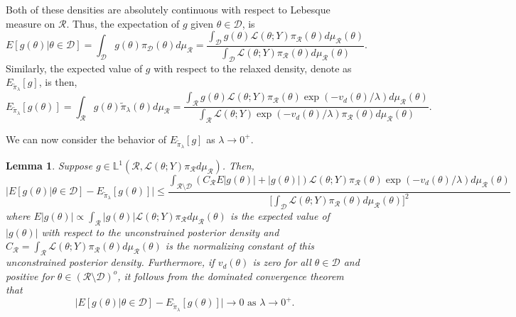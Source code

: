 \documentclass[10pt,fleqn]{article}
\newtheorem{lemma}{Lemma}
\DeclareMathOperator{\1}{\mathbbm{1}}
\begin{document}
{Both of these densities are absolutely continuous with respect to Lebesque measure on $\mathcal{R}$.  Thus, the expectation of $g$ given $\theta\in\mathcal{D}$, is
\begin{equation}
\label{EQ:Expectation_Positive_Measure_Constraint}
E[g(\theta)|\theta\in\mathcal{D}] = \int_\mathcal{D} g(\theta)\pi_\mathcal{D}(\theta)d\mu_\mathcal{R} = \frac{\int_\mathcal{D} g(\theta)\mathcal{L}(\theta; Y) \pi_\mathcal{R}(\theta)d\mu_\mathcal{R}(\theta)}{\int_\mathcal{D} \mathcal{L}(\theta; Y) \pi_\mathcal{R}(\theta)d\mu_\mathcal{R}(\theta)}.
\end{equation} 
Similarly, the expected value of $g$ with respect to the relaxed density, denote as $E_{\tilde{\pi}_\lambda}[g]$, is then,
\begin{equation}
\label{EQ:Expectation_Positive_Measure_Relaxed}
E_{\tilde{\pi}_\lambda}[g(\theta)] = \int_\mathcal{R} g(\theta)\tilde{\pi}_\lambda(\theta)d\mu_\mathcal{R} = \frac{\int_\mathcal{R} g(\theta)\mathcal{L}(\theta; Y) \pi_\mathcal{R}(\theta) \exp(-v_d(\theta)/\lambda)d\mu_\mathcal{R}(\theta)}{\int_\mathcal{R} \mathcal{L}(\theta; Y)\exp(-v_d(\theta)/\lambda) \pi_\mathcal{R}(\theta)d\mu_\mathcal{R}(\theta)}.\end{equation}

We can now consider the behavior of $E_{\tilde{\pi}_\lambda}[g]$ as $\lambda \to 0^+.$

\begin{lemma}
\label{THM:positive_measure_approximation_error}
Suppose $g \in \mathbb{L}^1(\mathcal{R}, \mathcal{L}(\theta;Y)\pi_\mathcal{R}d\mu_\mathcal{R})$.  Then,
$$\bigg|E[g(\theta) |\theta\in\mathcal{D}] - E_{\tilde{\pi}_\lambda}[g(\theta)]   \bigg| \le \frac{\int_{\mathcal{R}\setminus \mathcal{D}} (C_\mathcal{R}E|g(\theta)|+|g(\theta)|) \mathcal{L}(\theta; Y) \pi_\mathcal{R}(\theta)\exp(-v_d(\theta)/\lambda ) d\mu_\mathcal{R}(\theta)}{\big[\int_\mathcal{D} \mathcal{L}(\theta; Y) \pi_\mathcal{R}(\theta)d\mu_\mathcal{R}(\theta)\big]^2 }$$
where $E|g(\theta)| \propto \int_\mathcal{R} |g(\theta)| \mathcal{L}(\theta;Y)\pi_\mathcal{R} d\mu_\mathcal{R}(\theta)$ is the expected value of $|g(\theta)|$ with respect to the unconstrained posterior density and $C_\mathcal{R} = \int_\mathcal{R} \mathcal{L}(\theta;Y)\pi_\mathcal{R}(\theta)d\mu_\mathcal{R}(\theta)$ is the normalizing constant of this unconstrained posterior density. Furthermore, if $v_d(\theta)$ is zero for all $\theta\in\mathcal{D}$ and positive for $\theta\in(\mathcal{R}\setminus\mathcal{D})^o$, it follows from the dominated convergence theorem that $$\bigg|E[g(\theta) |\theta\in\mathcal{D}] - E_{\tilde{\pi}_\lambda}[g(\theta)]   \bigg|\to 0 \text{ as } \lambda \to 0^+.$$
\end{lemma}

}
\end{document}
